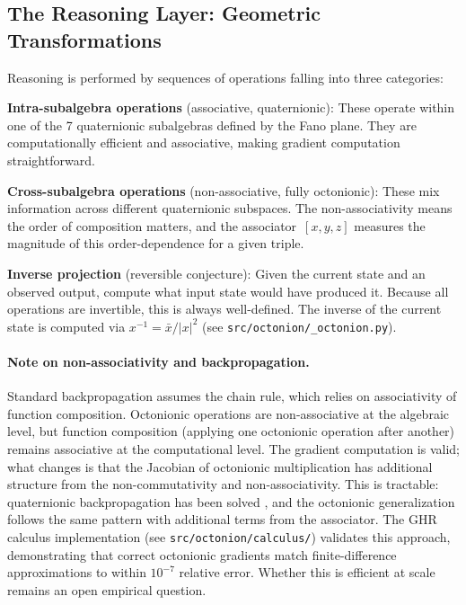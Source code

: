 \documentclass[11pt,a4paper]{article}
\begin{document}
\subsection{The Reasoning Layer: Geometric Transformations}

Reasoning is performed by sequences of operations falling into three categories:

\textbf{Intra-subalgebra operations} (associative, quaternionic): These operate within one of the 7 quaternionic subalgebras defined by the Fano plane. They are computationally efficient and associative, making gradient computation straightforward.

\textbf{Cross-subalgebra operations} (non-associative, fully octonionic): These mix information across different quaternionic subspaces. The non-associativity means the order of composition matters, and the associator~$[x,y,z]$ measures the magnitude of this order-dependence for a given triple.

\textbf{Inverse projection} (reversible conjecture): Given the current state and an observed output, compute what input state would have produced it. Because all operations are invertible, this is always well-defined. The inverse of the current state is computed via $x^{-1} = \bar{x}/\lvert x \rvert^2$ (see \texttt{src/octonion/\_octonion.py}).

\paragraph{Note on non-associativity and backpropagation.} Standard backpropagation assumes the chain rule, which relies on associativity of function composition. Octonionic operations are non-associative at the algebraic level, but function composition (applying one octonionic operation after another) remains associative at the computational level. The gradient computation is valid; what changes is that the Jacobian of octonionic multiplication has additional structure from the non-commutativity and non-associativity. This is tractable: quaternionic backpropagation has been solved \citep{Parcollet2019}, and the octonionic generalization follows the same pattern with additional terms from the associator. The GHR calculus implementation (see \texttt{src/octonion/calculus/}) validates this approach, demonstrating that correct octonionic gradients match finite-difference approximations to within $10^{-7}$ relative error. Whether this is efficient at scale remains an open empirical question.
\end{document}

